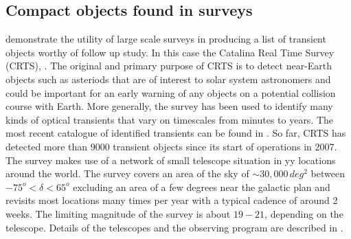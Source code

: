 \documentclass[a4paper,fleqn,usenatbib]{mnras}
\begin{document}
\subsection{Compact objects found in surveys}
\citet{Breedt2014} demonstrate the utility of large scale surveys in producing a list of transient objects worthy of follow up study. In this case the Catalina Real Time Survey (CRTS), \citep{Drake2009}. The original and primary purpose of CRTS is to detect near-Earth objects such as asteriods that are of interest to solar system astronomers and could be important for an early warning of any objects on a potential collision course with Earth. More generally, the survey has been used to identify many kinds of optical transients that vary on timescales from minutes to years. The most recent catalogue of identified transients can be found in \citet{CatalinaCatalog}. So far, CRTS has detected more than 9000 transient objects since its start of operations in 2007. The survey makes use of a network of  small telescope situation in yy locations around the world. The survey covers an area of the sky of $\sim 30,000\,deg^2$ between $-75^o < \delta < 65^o$ excluding an area of a few degrees near the galactic plan and revisits most locations many times per year with a typical cadence of around 2 weeks. The limiting magnitude of the survey is about $19-21$, depending on the telescope. Details of the telescopes and the observing program are described in \citet{Drake2009}. 
\end{document}
